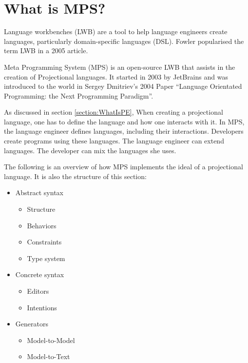 \section{What is MPS?}
\label{section:MPS}

Language workbenches (LWB) are a tool to help language engineers create languages, particularly domain-specific languages (DSL).
Fowler\cite{Fowler_lwb} popularised the term LWB in a 2005 article.

Meta Programming System (MPS) is an open-source LWB that assists in the creation of Projectional languages.
It started in 2003 by JetBrains and was introduced to the world in Sergey Dmitriev's 2004 Paper ``Language Orientated Programming: the Next Programming Paradigm''\cite{dmitriev2004language}.

As discussed in section \ref{section:WhatIsPE}, When creating a projectional language, one has to define the language and how one interacts with it.
In MPS, the language engineer defines languages, including their interactions.
Developers create programs using these languages.
The language engineer can extend languages.
The developer can mix the languages she uses.

The following is an overview of how MPS implements the ideal of a projectional language.
It is also the structure of this section: 

\begin{itemize}
    \item Abstract syntax
    \begin{itemize}
        \item Structure
        \item Behaviors
        \item Constraints
        \item Type system
    \end{itemize}
    \item Concrete syntax
    \begin{itemize}
        \item Editors
        \item Intentions
    \end{itemize}
    \item Generators
    \begin{itemize}
        \item Model-to-Model
        \item Model-to-Text
    \end{itemize}
\end{itemize}

